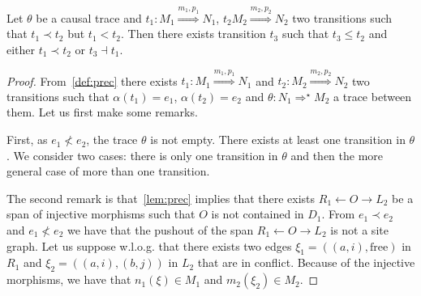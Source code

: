 \begin{lemma}
  Let $\theta$ be a causal trace and $t_1:M_1\overset{m_1,p_1}{\Rightarrow} N_1$, $t_2M_2\overset{m_2,p_2}{\Rightarrow} N_2$ two transitions such that $t_1\prec t_2$ but $t_1< t_2$. Then there exists transition $t_3$ such that $t_3\leq t_2$ and either $t_1\prec t_2$ or $t_3\dashv t_1$.
\end{lemma}
\begin{proof}
  From~\autoref{def:prec} there exists $t_1:M_1\overset{m_1,p_1}{\Rightarrow} N_1$ and $t_2:M_2\overset{m_2,p_2}{\Rightarrow} N_2$ two transitions such that $\alpha(t_1)=e_1$, $\alpha(t_2)=e_2$ and $\theta:N_1\Rightarrow^{\star}M_2$ a trace between them. Let us first make some remarks.

  First, as $e_1\not< e_2$, the trace $\theta$ is not empty. There exists at least one transition in $\theta$. We consider two cases: there is only one transition in $\theta$ and then the more general case of more than one transition.

  The second remark is that~\autoref{lem:prec} implies that there exists $R_1\leftarrow O\rightarrow L_2$ be a span of injective morphisms such that $O$ is not contained in $D_1$. From $e_1\prec e_2$ and $e_1\not< e_2$ we have that the pushout of the span $R_1\leftarrow O\rightarrow L_2$ is not a site graph. Let us suppose w.l.o.g. that there exists two edges $\xi_1=((a,i), \text{free})$ in $R_1$ and $\xi_2=((a,i),(b,j))$ in $L_2$ that are in conflict. Because of the injective morphisms, we have that $n_1(\xi) \in M_1$ and $m_2(\xi_2)\in M_2$.


\end{proof}
